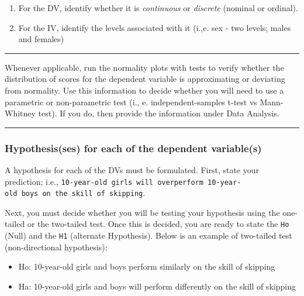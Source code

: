 \documentclass[
]{article}
\providecommand{\tightlist}{%
  \setlength{\itemsep}{0pt}\setlength{\parskip}{0pt}}
\begin{document}
\begin{enumerate}
\def\labelenumi{\alph{enumi}.}
\item
  For the DV, identify whether it is \emph{continuous} or \emph{discrete} (nominal or ordinal).
\item
  For the IV, identify the levels associated with it (i.,e. sex - two levels; males and females)
\end{enumerate}

\begin{center}\rule{0.5\linewidth}{0.5pt}\end{center}

Whenever applicable, run the normality plots with tests to verify whether the distribution of scores for the dependent variable is approximating or deviating from normality. Use this information to decide whether you will need to use a parametric or non-parametric test (i., e. independent-samples t-test vs Mann-Whitney test). If you do, then provide the information under Data Analysis.

\begin{center}\rule{0.5\linewidth}{0.5pt}\end{center}

\hypertarget{hypothesisses-for-each-of-the-dependent-variables}{%
\subsubsection{Hypothesis(ses) for each of the dependent variable(s)}\label{hypothesisses-for-each-of-the-dependent-variables}}

A hypothesis for each of the DVs must be formulated. First, state your prediction; i.e., \texttt{10-year-old\ girls\ will\ overperform\ 10-year-old\ boys\ on\ the\ skill\ of\ skipping}.

Next, you must decide whether you will be testing your hypothesis using the one-tailed or the two-tailed test. Once this is decided, you are ready to state the \texttt{Ho} (Null) and the \texttt{H1} (alternate Hypothesis). Below is an example of two-tailed test (non-directional hypothesis):

\begin{itemize}
\tightlist
\item
  Ho: 10-year-old girls and boys perform similarly on the skill of skipping
\item
  Ha: 10-year-old girls and boys will perform differently on the skill of skipping
\end{itemize}
\end{document}
